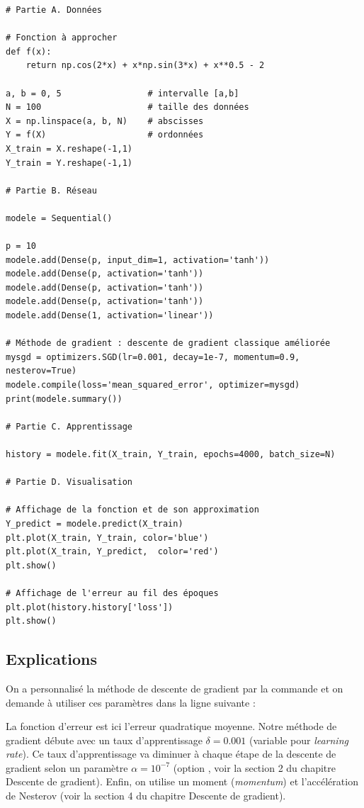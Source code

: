 \documentclass[11pt,class=report,crop=false]{standalone}
\begin{document}
\begin{lstlisting}
# Partie A. Données

# Fonction à approcher
def f(x):
    return np.cos(2*x) + x*np.sin(3*x) + x**0.5 - 2

a, b = 0, 5                 # intervalle [a,b]
N = 100                     # taille des données
X = np.linspace(a, b, N)    # abscisses
Y = f(X)                    # ordonnées
X_train = X.reshape(-1,1)
Y_train = Y.reshape(-1,1)

# Partie B. Réseau 

modele = Sequential()

p = 10
modele.add(Dense(p, input_dim=1, activation='tanh'))
modele.add(Dense(p, activation='tanh'))
modele.add(Dense(p, activation='tanh'))
modele.add(Dense(p, activation='tanh'))
modele.add(Dense(1, activation='linear'))

# Méthode de gradient : descente de gradient classique améliorée
mysgd = optimizers.SGD(lr=0.001, decay=1e-7, momentum=0.9, nesterov=True)
modele.compile(loss='mean_squared_error', optimizer=mysgd)
print(modele.summary())

# Partie C. Apprentissage

history = modele.fit(X_train, Y_train, epochs=4000, batch_size=N)

# Partie D. Visualisation

# Affichage de la fonction et de son approximation
Y_predict = modele.predict(X_train)
plt.plot(X_train, Y_train, color='blue')
plt.plot(X_train, Y_predict,  color='red')
plt.show()

# Affichage de l'erreur au fil des époques
plt.plot(history.history['loss'])
plt.show()
\end{lstlisting}

\subsection{Explications}

On a personnalisé la méthode de descente de gradient par la commande 
et on demande à utiliser ces paramètres dans la ligne suivante :

La fonction d'erreur est ici l'erreur quadratique moyenne.
Notre méthode de gradient débute avec un taux d'apprentissage 
$\delta = 0.001$ (variable  pour \emph{learning rate}).
Ce taux d'apprentissage va diminuer à chaque étape de la descente de gradient selon un paramètre $\alpha = 10^{-7}$ (option , voir la section 2 du chapitre \og{}Descente de gradient\fg{}).
Enfin, on utilise un moment (\emph{momentum}) et l'accélération de Nesterov (voir la section 4 du chapitre \og{}Descente de gradient\fg{}).
\end{document}
